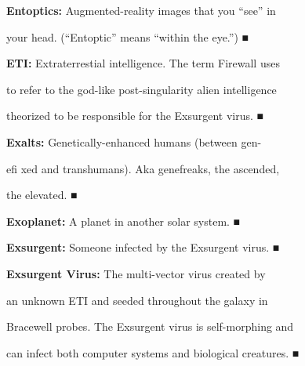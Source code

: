 \textbf{ Entoptics:} Augmented-reality images that you ``see'' in 

your head. (``Entoptic'' means ``within the eye.'')
■

\textbf{ ETI:} Extraterrestial intelligence. The term Firewall uses 

to refer to the god-like post-singularity alien intelligence 

theorized to be responsible for the Exsurgent virus.
■

\textbf{ Exalts:} Genetically-enhanced humans (between gen-

eﬁ xed and transhumans). Aka genefreaks, the ascended, 

the elevated.
■

\textbf{ Exoplanet:} A planet in another solar system.
■

\textbf{ Exsurgent:} Someone infected by the Exsurgent virus.
■

\textbf{ Exsurgent Virus:} The multi-vector virus created by 

an unknown ETI and seeded throughout the galaxy in 

Bracewell probes. The Exsurgent virus is self-morphing and 

can infect both computer systems and biological creatures.
■

